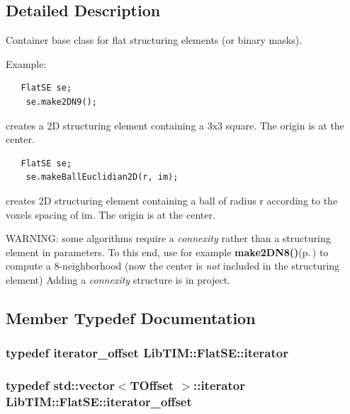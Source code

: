 \subsection{Detailed Description}
Container base class for flat structuring elements (or binary masks). 

\begin{Desc}
\item[Example:]

\footnotesize\begin{verbatim}	FlatSE se;
	se.make2DN9();
	\end{verbatim}
\normalsize
 creates a 2D structuring element containing a 3x3 square. The origin is at the center. 

\footnotesize\begin{verbatim}	FlatSE se;
	se.makeBallEuclidian2D(r, im);
	\end{verbatim}
\normalsize
 creates 2D structuring element containing a ball of radius r according to the voxels spacing of im. The origin is at the center.\end{Desc}
WARNING: some algorithms require a {\em connexity\/} rather than a structuring element in parameters. To this end, use for example {\bf make2DN8()}{\rm (p.\,\pageref{classLibTIM_1_1FlatSE_a19})} to compute a 8-neighborhood (now the center is {\em not\/} included in the structuring element) Adding a {\em connexity\/} structure is in project.



\subsection{Member Typedef Documentation}
\subsubsection{\setlength{\rightskip}{0pt plus 5cm}typedef {\bf iterator\_\-offset} {\bf Lib\-TIM::Flat\-SE::iterator}}\label{classLibTIM_1_1FlatSE_w2}


\subsubsection{\setlength{\rightskip}{0pt plus 5cm}typedef std::vector$<${\bf TOffset} $>$::{\bf iterator} {\bf Lib\-TIM::Flat\-SE::iterator\_\-offset}}\label{classLibTIM_1_1FlatSE_w1}


